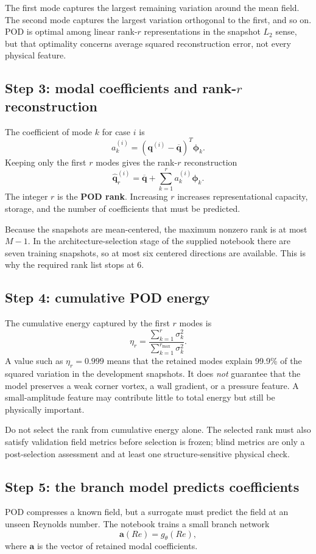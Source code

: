 \documentclass[11pt]{article}
\begin{document}
The first mode captures the largest remaining variation around the mean field. The second mode captures the largest variation orthogonal to the first, and so on. POD is optimal among linear rank-$r$ representations in the snapshot $L_2$ sense, but that optimality concerns average squared reconstruction error, not every physical feature.

\subsection{Step 3: modal coefficients and rank-$r$ reconstruction}
The coefficient of mode $k$ for case $i$ is
\[
a_k^{(i)}=(\mathbf q^{(i)}-\overline{\mathbf q})^T\boldsymbol\phi_k.
\]
Keeping only the first $r$ modes gives the rank-$r$ reconstruction
\[
\widehat{\mathbf q}^{(i)}_{r}
=\overline{\mathbf q}
+\sum_{k=1}^{r}a_k^{(i)}\boldsymbol\phi_k.
\]
The integer $r$ is the \textbf{POD rank}. Increasing $r$ increases representational capacity, storage, and the number of coefficients that must be predicted.

Because the snapshots are mean-centered, the maximum nonzero rank is at most $M-1$. In the architecture-selection stage of the supplied notebook there are seven training snapshots, so at most six centered directions are available. This is why the required rank list stops at 6.

\subsection{Step 4: cumulative POD energy}
The cumulative energy captured by the first $r$ modes is
\[
\eta_r=\frac{\sum_{k=1}^{r}\sigma_k^2}
{\sum_{k=1}^{r_{\max}}\sigma_k^2}.
\]
A value such as $\eta_r=0.999$ means that the retained modes explain 99.9\% of the squared variation in the development snapshots. It does \emph{not} guarantee that the model preserves a weak corner vortex, a wall gradient, or a pressure feature. A small-amplitude feature may contribute little to total energy but still be physically important.

\begin{warningbox}
Do not select the rank from cumulative energy alone. The selected rank must also satisfy validation field metrics before selection is frozen; blind metrics are only a post-selection assessment and at least one structure-sensitive physical check.
\end{warningbox}

\subsection{Step 5: the branch model predicts coefficients}
POD compresses a known field, but a surrogate must predict the field at an unseen Reynolds number. The notebook trains a small branch network
\[
\mathbf a(Re)=g_{\theta}(Re),
\]
where $\mathbf a$ is the vector of retained modal coefficients.
\end{document}
